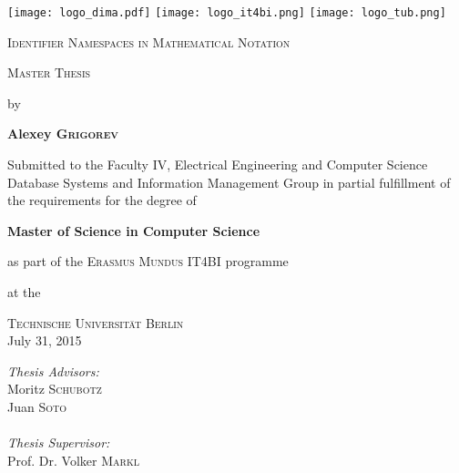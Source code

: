 
\begin{titlepage}
\begin{center}

\texttt{[image: logo\_dima.pdf]}
\hfill
\texttt{[image: logo\_it4bi.png]}
\hfill
\texttt{[image: logo\_tub.png]}


\vspace*{1.5cm}

\LARGE
\textsc{Identifier Namespaces in Mathematical Notation}

\vspace{1cm}

\Large \textsc{Master Thesis}

\vspace{0.2cm}

by

\vspace{0.4cm}


\textbf{Alexey \textsc{Grigorev}}

\vspace{1.0cm}

\vfill

\large
Submitted to the Faculty IV, Electrical Engineering and Computer Science
Database Systems and Information Management Group
in partial fulfillment of the requirements for the degree of

\textbf{Master of Science in Computer Science}

as part of the \textsc{Erasmus Mundus} IT4BI programme

at the

\textsc{Technische Universit\"{a}t Berlin} \\

July 31, 2015

\vfill

\begin{flushright}
\normalsize
\emph{Thesis Advisors:}\\
Moritz \textsc{Schubotz} \\
Juan \textsc{Soto} \\

\ \\

\emph{Thesis Supervisor:}\\
Prof. Dr. Volker \textsc{Markl}\\
\end{flushright}


\end{center}
\end{titlepage}

